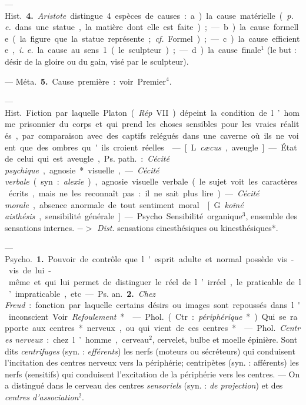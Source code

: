 \begin{itemize}[leftmargin=1cm, label=, itemsep=11pt]
— \si{Hist.} {\bf 4.} {\it Aristote} distingue
4 espèces de causes : a) la cause matérielle ({\it p. e.} dans une statue, la
matière dont elle est faite); — b) la
cause formelle (la figure que la statue
représente; {\it cf.} Formel); — c) la
cause efficiente, {\it i. e.} la cause au sens 1
(le sculpteur); — d) la cause finale$^1$
(le but : désir de la gloire ou du gain,
visé par le sculpteur).

— \si{Méta.} {\bf 5.} Cause première : voir
Premier$^4$.

 — \si{Hist.}
Fiction par laquelle Platon ({\it Rép}
VII) dépeint la condition de l’homme
prisonnier du corps et qui prend les
%
choses sensibles pour les vraies réalités, par comparaison avec des
captifs relégués dans une caverne
où ils ne voient que des ombres
qu'ils croient réelles.

 — [L. {\it cæcus}, aveugle] — État
de celui qui est aveugle, \si{Ps. path.} :
{\it Cécité psychique}, agnosie* visuelle,
— {\it Cécité verbale} (syn. : {\it alexie}),
agnosie visuelle verbale (le sujet
voit les caractères écrits, mais ne les
reconnaît pas : il ne sait plus lire).
— {\it Cécité morale}, absence anormale
de tout sentiment moral.

 [G. {\it koïné
aisthésis}, sensibilité générale]. —
Psycho. Sensibilité organique$^3$, ensemble des sensations internes.
$->$ {\it Dist.} sensations cinesthésiques
ou kinesthésiques*.

 — \si{Psycho.} {\bf 1.} Pouvoir de
contrôle que l'esprit adulte et normal possède vis-vis de lui-même
et qui lui permet de distinguer le
réel de l’irréel, le praticable de l’impraticable, etc. — \si{Ps. an.} {\bf 2.} {\it Chez
Freud} : fonction par laquelle certains désirs ou images sont repoussés
dans l'inconscient. Voir {\it Refoulement}*.

 — \si{Phol.} (Ctr. : {\it périphérique}*).
Qui se rapporte aux centres* nerveux, ou qui vient de ces centres*.

 — \si{Phol.} {\it Centres nerveux} :
chez l’homme, cerveau$^2$, cervelet,
bulbe et moelle épinière. Sont dits
{\it centrifuges} (syn. : {\it efférents}) les nerfs
(moteurs ou sécréteurs) qui conduisent l'incitation des centres nerveux
vers la périphérie; centripètes (syn. :
afférents) les nerfs (sensitifs) qui
conduisent l'excitation de la périphérie vers les centres. — On a distingué dans le cerveau des centres
{\it sensoriels} (syn. : {\it de projection}) et des
{\it centres d'association}$^2$.


\end{itemize}
